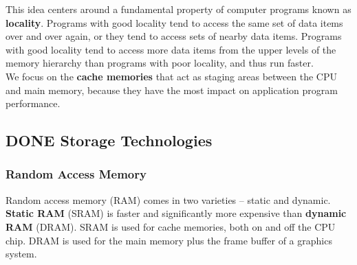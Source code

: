 \documentclass[11pt]{article}
\begin{document}
This idea centers around a fundamental property of computer programs known as \textbf{locality}. Programs with good locality tend to access the same set of data items over and over again, or they tend to access sets of nearby data items. Programs with good locality tend to access more data items from the upper levels of the memory hierarchy than programs with poor locality, and thus run faster.\\

We focus on the \textbf{cache memories} that act as staging areas between the CPU and main memory, because they have the most impact on application program performance.\\

\subsection{{\bfseries\sffamily DONE} Storage Technologies}
\label{sec:org8eb9cca}

\subsubsection{Random Access Memory}
\label{sec:org261b1c3}
Random access memory (RAM) comes in two varieties -- static and dynamic. \textbf{Static RAM} (SRAM) is faster and significantly more expensive than \textbf{dynamic RAM} (DRAM). SRAM is used for cache memories, both on and off the CPU chip. DRAM is used for the main memory plus the frame buffer of a graphics system.\\
\end{document}
